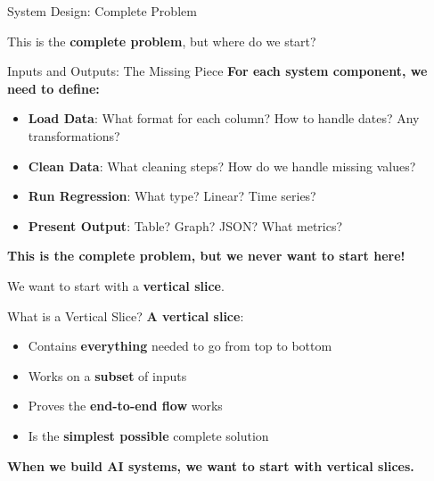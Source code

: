 \documentclass[aspectratio=169]{beamer}
\begin{document}
\begin{frame}{System Design: Complete Problem}
\begin{center}
\end{center}
\vspace{0.2cm}
This is the \textbf{complete problem}, but where do we start?
\end{frame}

\begin{frame}{Inputs and Outputs: The Missing Piece}
\textbf{For each system component, we need to define:}
\begin{itemize}
    \item \textbf{Load Data}: What format for each column? How to handle dates? Any transformations?
    \item \textbf{Clean Data}: What cleaning steps? How do we handle missing values?
    \item \textbf{Run Regression}: What type? Linear? Time series?
    \item \textbf{Present Output}: Table? Graph? JSON? What metrics?
\end{itemize}
\vspace{0.3cm}
\pause
\textbf{This is the complete problem, but we never want to start here!}
\vspace{0.2cm}

We want to start with a \textbf{vertical slice}.
\end{frame}

\begin{frame}{What is a Vertical Slice?}
\textbf{A vertical slice}:
\begin{itemize}
    \item Contains \textbf{everything} needed to go from top to bottom
    \item Works on a \textbf{subset} of inputs
    \item Proves the \textbf{end-to-end flow} works
    \item Is the \textbf{simplest possible} complete solution
\end{itemize}
\vspace{0.3cm}

\textbf{When we build AI systems, we want to start with vertical slices.}
\end{frame}
\end{document}
